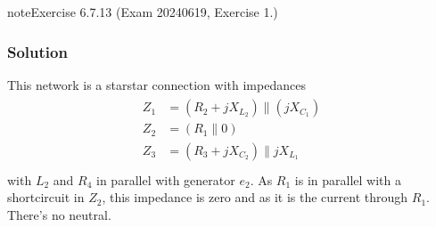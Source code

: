 \documentclass[letterpaper,10pt,english]{jupyterBook}
\begin{document}
\begin{sphinxadmonition}{note}{Exercise 6.7.13 (Exam 2024\sphinxhyphen{}06\sphinxhyphen{}19, Exercise 1.)}



\begin{figure}[htbp]
\centering

\noindent{}
\end{figure}
\subsubsection*{Solution}

\sphinxAtStartPar
This network is a star\sphinxhyphen{}star connection with impedances
\begin{equation*}
\begin{split}\begin{aligned}
  Z_1 & = ( R_2 + j X_{L_2} ) \parallel ( j X_{C_1} ) \\
  Z_2 & = ( R_1 \parallel 0 ) \\
  Z_3 & = ( R_3 + j X_{C_2} ) \parallel j X_{L_1} \\
\end{aligned}\end{split}
\end{equation*}
\sphinxAtStartPar
with \(L_2\) and \(R_4\) in parallel with generator \(e_2\). As \(R_1\) is in parallel with a short\sphinxhyphen{}circuit in \(Z_2\), this impedance is zero and as it is the current through \(R_1\). There’s no neutral.


\end{sphinxadmonition}
\end{document}
